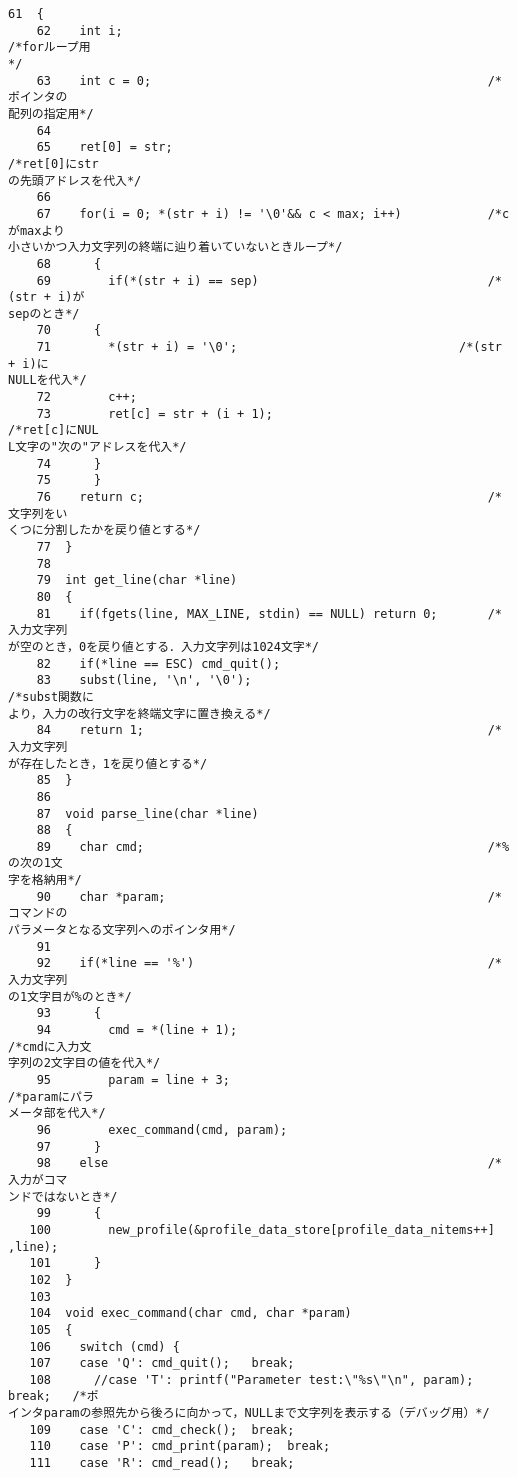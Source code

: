 \begin{Verbatim}[fontsize=\small, baselinestretch=0.8]
    61	{
    62	  int i;                                                   /*forループ用
*/
    63	  int c = 0;                                               /*ポインタの
配列の指定用*/
    64	
    65	  ret[0] = str;                                            /*ret[0]にstr
の先頭アドレスを代入*/
    66	
    67	  for(i = 0; *(str + i) != '\0'&& c < max; i++)            /*cがmaxより
小さいかつ入力文字列の終端に辿り着いていないときループ*/
    68	    {
    69	      if(*(str + i) == sep)                                /*(str + i)が
sepのとき*/
    70		{
    71		  *(str + i) = '\0';                               /*(str + i)に
NULLを代入*/
    72		  c++;
    73		  ret[c] = str + (i + 1);                          /*ret[c]にNUL
L文字の"次の"アドレスを代入*/
    74		}
    75	    }
    76	  return c;                                                /*文字列をい
くつに分割したかを戻り値とする*/
    77	}
    78	
    79	int get_line(char *line)
    80	{
    81	  if(fgets(line, MAX_LINE, stdin) == NULL) return 0;       /*入力文字列
が空のとき，0を戻り値とする．入力文字列は1024文字*/
    82	  if(*line == ESC) cmd_quit();
    83	  subst(line, '\n', '\0');                                 /*subst関数に
より，入力の改行文字を終端文字に置き換える*/
    84	  return 1;                                                /*入力文字列
が存在したとき，1を戻り値とする*/
    85	}
    86	
    87	void parse_line(char *line)
    88	{
    89	  char cmd;                                                /*%の次の1文
字を格納用*/
    90	  char *param;                                             /*コマンドの
パラメータとなる文字列へのポインタ用*/
    91	
    92	  if(*line == '%')                                         /*入力文字列
の1文字目が%のとき*/
    93	    {
    94	      cmd = *(line + 1);                                   /*cmdに入力文
字列の2文字目の値を代入*/
    95	      param = line + 3;                                    /*paramにパラ
メータ部を代入*/
    96	      exec_command(cmd, param);
    97	    }
    98	  else                                                     /*入力がコマ
ンドではないとき*/
    99	    {
   100	      new_profile(&profile_data_store[profile_data_nitems++] ,line);
   101	    }
   102	}
   103	
   104	void exec_command(char cmd, char *param)
   105	{
   106	  switch (cmd) {
   107	  case 'Q': cmd_quit();   break;
   108	    //case 'T': printf("Parameter test:\"%s\"\n", param); break;   /*ポ
インタparamの参照先から後ろに向かって，NULLまで文字列を表示する（デバッグ用）*/
   109	  case 'C': cmd_check();  break;
   110	  case 'P': cmd_print(param);  break;
   111	  case 'R': cmd_read();   break;

\end{Verbatim}
